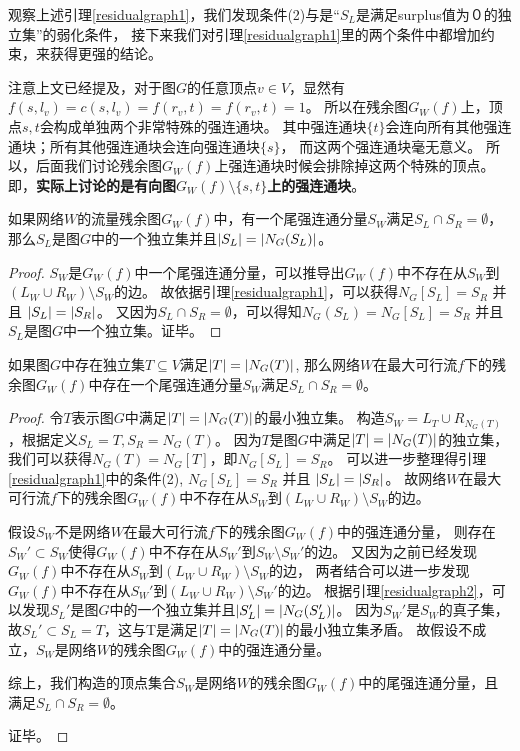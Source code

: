 观察上述引理\ref{residualgraph1}，我们发现条件(2)与是“$S_L$是满足surplus值为０的独立集”的弱化条件，
接下来我们对引理\ref{residualgraph1}里的两个条件中都增加约束，来获得更强的结论。

注意上文已经提及，对于图$G$的任意顶点$v \in V$，显然有$f(s, l_v) = c(s, l_v) = f(r_v, t) = f(r_v, t) = 1$。
所以在残余图$G_W(f)$上，顶点$s,t$会构成单独两个非常特殊的强连通块。
其中强连通块$\{t\}$会连向所有其他强连通块；所有其他强连通块会连向强连通块$\{s\}$，
而这两个强连通块毫无意义。
所以，后面我们讨论残余图$G_W(f)$上强连通块时候会排除掉这两个特殊的顶点。
即，\textbf{实际上讨论的是有向图$G_W(f) \setminus \{s, t\}$上的强连通块}。


\begin{lemma}  \label{residualgraph2}
如果网络$W$的流量残余图$G_W(f)$中，有一个尾强连通分量$S_W$满足$S_L \cap S_R = \emptyset$，
那么$S_L$是图$G$中的一个独立集并且$\left\vert S_L \right\vert = \left\vert N_G(S_L) \right\vert$。
\end{lemma}
\begin{proof}
$S_W$是$G_W(f)$中一个尾强连通分量，可以推导出$G_W(f)$中不存在从$S_W$到$(L_W \cup R_W) \setminus S_W$的边。
故依据引理\ref{residualgraph1}，可以获得$N_G[S_L] = S_R$ 并且 $\left\vert S_L \right\vert = \left\vert S_R \right\vert$。
又因为$S_L \cap S_R = \emptyset$，可以得知$N_G(S_L) = N_G[S_L] = S_R$ 并且 $S_L$是图$G$中一个独立集。证毕。
\end{proof}

\begin{lemma}  \label{residualgraph3}
如果图$G$中存在独立集$T \subseteq V$满足$\left\vert T \right\vert = \left\vert N_G(T) \right\vert$,
那么网络$W$在最大可行流$f$下的残余图$G_W(f)$中存在一个尾强连通分量$S_W$满足$S_L \cap S_R = \emptyset$。
\end{lemma}
\begin{proof}
令$T$表示图$G$中满足$\left\vert T \right\vert = \left\vert N_G(T) \right\vert$的最小独立集。
构造$S_W = L_T \cup R_{N_G(T)}$，根据定义$S_L = T, S_R = N_G(T)$。
因为$T$是图$G$中满足$\left\vert T \right\vert = \left\vert N_G(T) \right\vert$的独立集，
我们可以获得$N_G(T) = N_G[T]$，即$N_G[S_L] = S_R$。
可以进一步整理得引理\ref{residualgraph1}中的条件(2), $N_G[S_L] = S_R$ 并且 $\left\vert S_L \right\vert = \left\vert S_R \right\vert$。
故网络$W$在最大可行流$f$下的残余图$G_W(f)$中不存在从$S_W$到$(L_W \cup R_W) \setminus S_W$的边。

假设$S_W$不是网络$W$在最大可行流$f$下的残余图$G_W(f)$中的强连通分量，
则存在$S_W' \subset S_W$使得$G_W(f)$中不存在从$S_W'$到$S_W \setminus S_W'$的边。
又因为之前已经发现$G_W(f)$中不存在从$S_W$到$(L_W \cup R_W) \setminus S_W$的边，
两者结合可以进一步发现$G_W(f)$中不存在从$S_W'$到$(L_W \cup R_W) \setminus S_W'$的边。
根据引理\ref{residualgraph2}，可以发现$S_L'$是图$G$中的一个独立集并且$\left\vert S_L' \right\vert = \left\vert N_G(S_L') \right\vert$。
因为$S_W'$是$S_W$的真子集，故$S_L' \subset S_L = T$，这与T是满足$\left\vert T \right\vert = \left\vert N_G(T) \right\vert$的最小独立集矛盾。
故假设不成立，$S_W$是网络$W$的残余图$G_W(f)$中的强连通分量。

综上，我们构造的顶点集合$S_W$是网络$W$的残余图$G_W(f)$中的尾强连通分量，且满足$S_L \cap S_R = \emptyset$。

证毕。
\end{proof}


